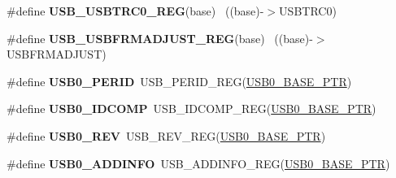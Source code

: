 \begin{DoxyCompactItemize}
\item 
\hypertarget{group___u_s_b___register___accessor___macros_gaf054f3a4251da894e8431bb28eceaa6e}{}\#define {\bfseries U\+S\+B\+\_\+\+U\+S\+B\+T\+R\+C0\+\_\+\+R\+E\+G}(base)                                    ~((base)-\/$>$U\+S\+B\+T\+R\+C0)\label{group___u_s_b___register___accessor___macros_gaf054f3a4251da894e8431bb28eceaa6e}

\item 
\hypertarget{group___u_s_b___register___accessor___macros_ga7976793373bcef48e82870e9391f7f55}{}\#define {\bfseries U\+S\+B\+\_\+\+U\+S\+B\+F\+R\+M\+A\+D\+J\+U\+S\+T\+\_\+\+R\+E\+G}(base)                          ~((base)-\/$>$U\+S\+B\+F\+R\+M\+A\+D\+J\+U\+S\+T)\label{group___u_s_b___register___accessor___macros_ga7976793373bcef48e82870e9391f7f55}

\item 
\hypertarget{group___u_s_b___register___accessor___macros_gabee4af6581d4520bd5d8d823d8668889}{}\#define {\bfseries U\+S\+B0\+\_\+\+P\+E\+R\+I\+D}~U\+S\+B\+\_\+\+P\+E\+R\+I\+D\+\_\+\+R\+E\+G(\hyperlink{group___u_s_b___peripheral_ga598ff5eb20a0551af232710b3f27640a}{U\+S\+B0\+\_\+\+B\+A\+S\+E\+\_\+\+P\+T\+R})\label{group___u_s_b___register___accessor___macros_gabee4af6581d4520bd5d8d823d8668889}

\item 
\hypertarget{group___u_s_b___register___accessor___macros_gac5372cae1990fc1ac7c4e92cf5f02e62}{}\#define {\bfseries U\+S\+B0\+\_\+\+I\+D\+C\+O\+M\+P}~U\+S\+B\+\_\+\+I\+D\+C\+O\+M\+P\+\_\+\+R\+E\+G(\hyperlink{group___u_s_b___peripheral_ga598ff5eb20a0551af232710b3f27640a}{U\+S\+B0\+\_\+\+B\+A\+S\+E\+\_\+\+P\+T\+R})\label{group___u_s_b___register___accessor___macros_gac5372cae1990fc1ac7c4e92cf5f02e62}

\item 
\hypertarget{group___u_s_b___register___accessor___macros_ga15f94e84d4edea37a5105310c316c303}{}\#define {\bfseries U\+S\+B0\+\_\+\+R\+E\+V}~U\+S\+B\+\_\+\+R\+E\+V\+\_\+\+R\+E\+G(\hyperlink{group___u_s_b___peripheral_ga598ff5eb20a0551af232710b3f27640a}{U\+S\+B0\+\_\+\+B\+A\+S\+E\+\_\+\+P\+T\+R})\label{group___u_s_b___register___accessor___macros_ga15f94e84d4edea37a5105310c316c303}

\item 
\hypertarget{group___u_s_b___register___accessor___macros_gaff725c65f6ef8cabfafd851c6d1cb41f}{}\#define {\bfseries U\+S\+B0\+\_\+\+A\+D\+D\+I\+N\+F\+O}~U\+S\+B\+\_\+\+A\+D\+D\+I\+N\+F\+O\+\_\+\+R\+E\+G(\hyperlink{group___u_s_b___peripheral_ga598ff5eb20a0551af232710b3f27640a}{U\+S\+B0\+\_\+\+B\+A\+S\+E\+\_\+\+P\+T\+R})\label{group___u_s_b___register___accessor___macros_gaff725c65f6ef8cabfafd851c6d1cb41f}


\end{DoxyCompactItemize}
